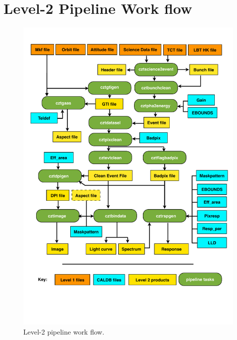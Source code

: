 \documentclass[11pt,oneside,a4paper]{article}
\begin{document}
\begin{enumerate}


\end{enumerate}

\section{Level-2 Pipeline Work flow}

\begin{figure}[]
    \includegraphics[width=\textwidth]{flowchart_userguide}
    \caption{Level-2 pipeline work flow.}
    \label{flowchart}
\end{figure}
\end{document}
